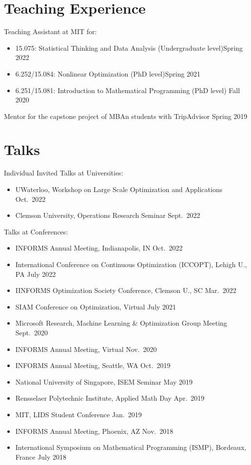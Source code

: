 \documentclass[11pt]{article}
\begin{document}
\section*{\large Teaching Experience}

\noindent Teaching Assistant at MIT for:
\begin{itemize}\setlength{\leftskip}{3ex}
\item  15.075: Statistical Thinking and Data Analysis (Undergraduate level)\hfill Spring 2022
\item  6.252/15.084: Nonlinear Optimization (PhD level)\hfill Spring 2021
\item 6.251/15.081: Introduction to Mathematical Programming (PhD level) \hfill Fall 2020
\end{itemize}

\noindent Mentor for the capstone project of MBAn students with TripAdvisor \hfill Spring 2019

\section*{\large Talks} %

{\noindent  Individual Invited Talks at Universities:
\begin{itemize}
\item UWaterloo, Workshop on Large Scale Optimization and Applications \hfill  Oct.\ 2022
\item Clemson University, Operations Research Seminar \hfill Sept.\ 2022
\end{itemize}
}

{\noindent Talks at Conferences:}
\begin{itemize}
\item INFORMS Annual Meeting, Indianapolis, IN \hfill Oct.\ 2022
\item International Conference on Continuous Optimization (ICCOPT), Lehigh U., PA  \hfill July 2022
\item IINFORMS Optimization Society Conference, Clemson U., SC \hfill Mar.\ 2022
\item SIAM Conference on Optimization, Virtual \hfill July 2021
\item Microsoft Research, Machine Learning \& Optimization  Group Meeting \hfill Sept.\ 2020
\item INFORMS Annual Meeting, Virtual \hfill Nov.\ 2020 
\item INFORMS Annual Meeting, Seattle, WA \hfill Oct.\ 2019
\item National University of Singapore, ISEM Seminar \hfill  May 2019
\item Rensselaer Polytechnic Institute, Applied Math Day \hfill Apr.\ 2019
\item MIT, LIDS Student Conference \hfill Jan.\ 2019
\item INFORMS Annual Meeting, Phoenix, AZ \hfill  Nov.\ 2018
\item International Symposium on Mathematical Programming (ISMP), Bordeaux, France \hfill July 2018
\end{itemize}
\end{document}

